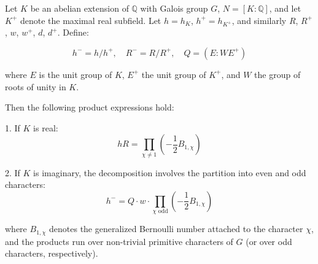 Let $K$ be an abelian extension of $\mathbb{Q}$ with Galois group $G$, $N = [K : \mathbb{Q}]$, and let $K^+$ denote the maximal real subfield. Let $h = h_K$, $h^+ = h_{K^+}$, and similarly $R$, $R^+$, $w$, $w^+$, $d$, $d^+$. Define:

$$h^- = h / h^+, \quad R^- = R / R^+, \quad Q = (E : W E^+)$$

where $E$ is the unit group of $K$, $E^+$ the unit group of $K^+$, and $W$ the group of roots of unity in $K$.

Then the following product expressions hold:

1. If $K$ is real:
   $$h R = \prod_{\chi \neq 1} \left( -\frac{1}{2} B_{1,\chi} \right)$$

2. If $K$ is imaginary, the decomposition involves the partition into even and odd characters:
   $$h^- = Q \cdot w \cdot \prod_{\chi \text{ odd}} \left( -\frac{1}{2} B_{1,\chi} \right)$$

where $B_{1,\chi}$ denotes the generalized Bernoulli number attached to the character $\chi$, and the products run over non-trivial primitive characters of $G$ (or over odd characters, respectively).

